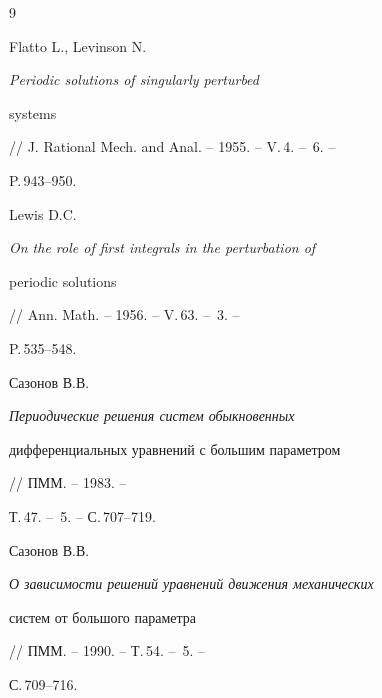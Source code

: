  


\begin{thebibliography}{9} 


 




Flatto L., Levinson N. {\em Periodic solutions of singularly perturbed 


systems} // J. Rational Mech. and Anal. -- 1955. -- V.\,4. -- \No\,6. -- 


P.\,943--950. 




Lewis D.C. {\em On the role of first integrals in the perturbation of 


periodic solutions} // Ann. Math. -- 1956. -- V.\,63. -- \No\,3. -- 


P.\,535--548. 




Сазонов В.В. {\em Периодические решения систем обыкновенных 


дифференциальных уравнений с большим параметром} // ПММ. -- 1983. -- 


Т.\,47. -- \No\,5. -- С.\,707--719. 




Сазонов В.В. {\em О зависимости решений уравнений движения механических 


систем от большого параметра} // ПММ. -- 1990. -- Т.\,54. -- \No\,5. -- 


С.\,709--716. 


 


\end{thebibliography} 


 


\vskip 2cm 


 






 


\label{end} 


 


